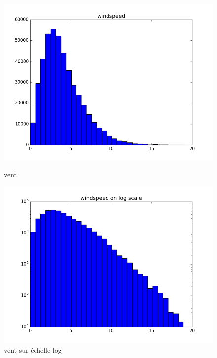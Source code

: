 \begin{figure}[H]
\captionsetup{labelformat=empty}
  \includegraphics[width=\linewidth]{images/vent.png}
  \caption{vent}
\endminipage\hfill
{}
  \includegraphics[width=\linewidth]{images/log_vent.png}
  \caption{vent sur échelle log}
\endminipage\hfill
\end{figure}

